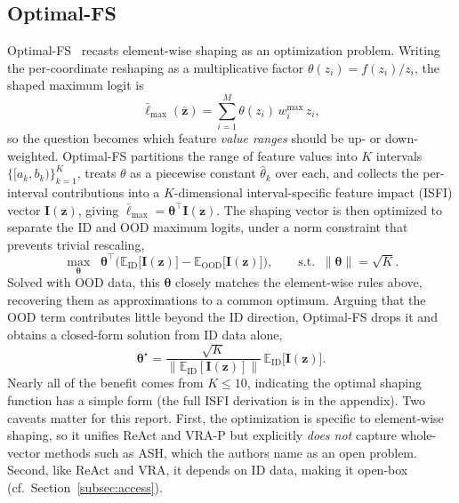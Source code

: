 \documentclass[a4paper]{article}
\begin{document}
\subsection{Optimal-FS}
\label{subsec:optfs}

Optimal-FS~\citep{optimalfs} recasts element-wise shaping as an optimization
problem. Writing the per-coordinate reshaping as a multiplicative factor
$\theta(z_i) = f(z_i)/z_i$, the shaped maximum logit is
\begin{equation}
\label{eq:optfs}
\bar{\ell}_{\max}(\bar{\mathbf{z}}) = \sum_{i=1}^{M} \theta(z_i)\, w^{\max}_i\, z_i ,
\end{equation}
so the question becomes which feature \emph{value ranges} should be up- or
down-weighted. Optimal-FS partitions the range of feature values into $K$ intervals
$\{[a_k, b_k)\}_{k=1}^{K}$, treats $\theta$ as a piecewise constant
$\hat{\theta}_k$ over each, and collects the per-interval contributions into a
$K$-dimensional interval-specific feature impact (ISFI) vector $\mathbf{I}(\mathbf{z})$,
giving $\bar{\ell}_{\max} = \boldsymbol{\theta}^{\top} \mathbf{I}(\mathbf{z})$. The
shaping vector is then optimized to separate the ID and OOD maximum logits, under a
norm constraint that prevents trivial rescaling,
\begin{equation}
\max_{\boldsymbol{\theta}} \;\;
\boldsymbol{\theta}^{\top}
\Big( \mathbb{E}_{\mathrm{ID}}\big[\mathbf{I}(\mathbf{z})\big]
- \mathbb{E}_{\mathrm{OOD}}\big[\mathbf{I}(\mathbf{z})\big] \Big),
\qquad \text{s.t.} \;\; \|\boldsymbol{\theta}\| = \sqrt{K}.
\end{equation}
Solved with OOD data, this $\boldsymbol{\theta}$ closely matches the element-wise
rules above, recovering them as approximations to a common optimum. Arguing that the
OOD term contributes little beyond the ID direction, Optimal-FS drops it and obtains
a closed-form solution from ID data alone,
\begin{equation}
\boldsymbol{\theta}^{\star} = \frac{\sqrt{K}}
{\big\| \mathbb{E}_{\mathrm{ID}}[\mathbf{I}(\mathbf{z})] \big\|}\,
\mathbb{E}_{\mathrm{ID}}\big[\mathbf{I}(\mathbf{z})\big] .
\end{equation}
Nearly all of the benefit comes from $K \leq 10$, indicating the optimal shaping
function has a simple form (the full ISFI derivation is in the appendix). Two
caveats matter for this report. First, the optimization is specific to element-wise
shaping, so it unifies ReAct and VRA-P but explicitly \emph{does not} capture
whole-vector methods such as ASH, which the authors name as an open problem.
Second, like ReAct and VRA, it depends on ID data, making it open-box
(cf.\ Section~\ref{subsec:access}).
\end{document}
